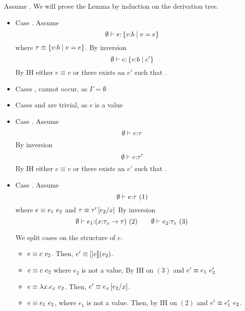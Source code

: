 Assume .
We will prove the Lemma by induction on the derivation tree.
\begin{itemize}
\item Case \rtexact. Assume
$$	\hastype{\emptyset}{e}{\tref{v}{b}{v = e}}
$$
where $\tau\equiv\tref{v}{b}{v=e}$.
By inversion
$$	\hastype{\emptyset}{e}{\tref{v}{b}{e'}}$$
By IH 
either $e \equiv v$ or there exists an $e'$ such that .

\item Cases \rtvarbase, \rtvar cannot occur, as $\Gamma = \emptyset$
\item Cases \rtconst and \rtfun are trivial, 
		as $e$ is a value
\item Case \rtsub. Assume 
$$\hastype{\emptyset}{e}{\tau}$$
By inversion
$$	\hastype{\emptyset}{e}{\tau'}$$
By IH 
either $e \equiv v$ or there exists an $e'$ such that .
\item Case \rtapp. Assume 
$$\hastype{\emptyset}{e}{\tau}\ (1)$$
where $e\equiv\eapp{e_1}{e_2}$ and $\tau\equiv\tau'\sub{x}{e_2}$
By inversion
$$
	\hastype{\emptyset}{e_1}{(\tfun{x}{\tau_{x}}{\tau})}\ (2)\qquad
	\hastype{\emptyset}{e_2}{\tau_{x}}\ (3)
$$

We split cases on the structure of $e$.
\begin{itemize}
\item $e\equiv \eapp{c}{v_2}$.
Then, $e'\equiv\interp{c}(v_2)$.

\item $e\equiv \eapp{c}{e_2}$ where $e_2$ is not a value, 
By IH on $(3)$  and  $e' \equiv \eapp{e_1}{e_2'}$

\item $e \equiv \eapp{\efun{x}{e_x}}{e_2}$.
Then, $e' \equiv e_x\sub{x}{e_2}$.

\item $e \equiv \eapp{e_1}{e_2}$, where $e_1$ is not a value.
Then, by IH on $(2)$  and 
$e'\equiv\eapp{e_1'}{e_2}$.
\end{itemize}
\end{itemize}